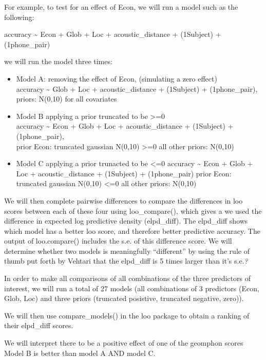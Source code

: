 \documentclass[]{article}
\begin{document}
For example, to test for an effect of Econ, we will run a model such as
the following:

accuracy \textasciitilde{} Econ + Glob + Loc + acoustic\_distance +
(1\textbar{}Subject) + (1\textbar{}phone\_pair)

we will run the model three times:

\begin{itemize}
\item
  Model A: removing the effect of Econ, (simulating a zero effect)\\
  accuracy \textasciitilde{} Glob + Loc + acoustic\_distance +
  (1\textbar{}Subject) + (1\textbar{}phone\_pair),\\
  priors: N(0,10) for all covariates
\item
  Model B applying a prior truncated to be \textgreater{}=0\\
  accuracy \textasciitilde{} Econ + Glob + Loc + acoustic\_distance +
  (1\textbar{}Subject) + (1\textbar{}phone\_pair),\\
  prior Econ: truncated gaussian N(0,10) \textgreater{}=0 all other
  priors: N(0,10)
\item
  Model C applying a prior trunacted to be \textless{}=0 accuracy
  \textasciitilde{} Econ + Glob + Loc + acoustic\_distance +
  (1\textbar{}Subject) + (1\textbar{}phone\_pair) prior Econ: truncated
  gaussian N(0,10) \textless{}=0 all other priors: N(0,10)
\end{itemize}

We will then complete pairwise differences to compare the differences in
loo scores between each of these four using loo\_compare(), which gives
a we used the difference in expected log predictive density
(elpd\_diff). The elpd\_diff shows which model has a better loo score,
and therefore better predictive accuracy. The output of loo.compare()
includes the s.e. of this difference score. We will determine whether
two models is meaningfully ``different'' by using the rule of thumb put
forth by Vehtari that the elpd\_diff is 5 times larger than it's
s.e.\emph{?}

In order to make all comparisons of all combinations of the three
predictors of interest, we will run a total of 27 models (all
combinations of 3 predictors (Econ, Glob, Loc) and three priors
(truncated posistive, truncated negative, zero)).

We will then use compare\_models() in the loo package to obtain a
ranking of their elpd\_diff scores.

We will interpret there to be a positive effect of one of the geomphon
scores Model B is better than model A AND model C.
\end{document}
